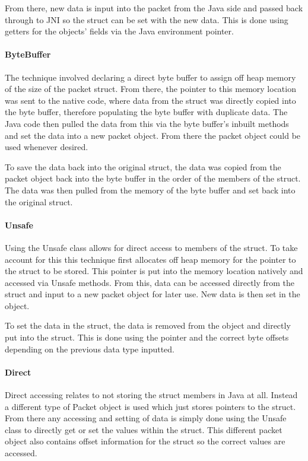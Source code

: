 \documentclass[final_report.tex]{subfiles}
\begin{document}
From there, new data is input into the packet from the Java side and passed back through to JNI so the struct can be set with the new data. This is done using getters for the objects' fields via the Java environment pointer.

\paragraph*{ByteBuffer}
The technique involved declaring a direct byte buffer to assign off heap memory of the size of the packet struct. From there, the pointer to this memory location was sent to the native code, where data from the struct was directly copied into the byte buffer, therefore populating the byte buffer with duplicate data. The Java code then pulled the data from this via the byte buffer's inbuilt methods and set the data into a new packet object. From there the packet object could be used whenever desired.

To save the data back into the original struct, the data was copied from the packet object back into the byte buffer in the order of the members of the struct. The data was then pulled from the memory of the byte buffer and set back into the original struct.

\paragraph*{Unsafe}
Using the Unsafe class allows for direct access to members of the struct. To take account for this this technique first allocates off heap memory for the pointer to the struct to be stored. This pointer is put into the memory location natively and accessed via Unsafe methods. From this, data can be accessed directly from the struct and input to a new packet object for later use. New data is then set in the object.

To set the data in the struct, the data is removed from the object and directly put into the struct. This is done using the pointer and the correct byte offsets depending on the previous data type inputted.

\paragraph*{Direct}
Direct accessing relates to not storing the struct members in Java at all. Instead a different type of Packet object is used which just stores pointers to the struct. From there any accessing and setting of data is simply done using the Unsafe class to directly get or set the values within the struct. This different packet object also contains offset information for the struct so the correct values are accessed.
\end{document}
